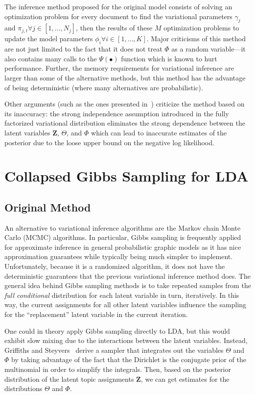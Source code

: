 \documentclass[11pt]{article}
\begin{document}
The inference method proposed for the original model consists of solving an
optimization problem for every document to find the variational parameters
$\gamma_j$ and $\pi_{j,t} \forall j\in[1,\ldots,N_j]$, then the results of
these $M$ optimization problems to update the model parameters
$\phi_i\forall i\in[1,\ldots,K]$. Major criticisms of this method are not
just limited to the fact that it does not treat $\Phi$ as a random
variable---it also contains many calls to the $\Psi(\bullet)$ function
which is known to hurt performance. Further, the memory requirements for
variational inference are larger than some of the alternative methods, but
this method has the advantage of being deterministic (where many
alternatives are probabilistic).

Other arguments (such as the ones presented in~\cite{Teh:2007:CVB})
criticize the method based on its inaccuracy: the strong independence
assumption introduced in the fully factorized variational distribution
eliminates the strong dependence between the latent variables $\mathbf{Z}$,
$\Theta$, and $\Phi$ which can lead to inaccurate estimates of the
posterior due to the loose upper bound on the negative log likelihood.

\section{Collapsed Gibbs Sampling for LDA}
\label{sec:cgs}
\subsection{Original Method}

An alternative to variational inference algorithms are the Markov chain
Monte Carlo (MCMC) algorithms. In particular, Gibbs sampling is frequently
applied for approximate inference in general probabilistic graphic models
as it has nice approximation guarantees while typically being much simpler
to implement. Unfortunately, because it is a randomized algorithm, it does
not have the deterministic guarantees that the previous variational
inference method does. The general idea behind Gibbs sampling methods is to take
repeated samples from the \emph{full conditional} distribution for each
latent variable in turn, iteratively. In this way, the current assignments
for all other latent variables influence the sampling for the
``replacement'' latent variable in the current iteration.

One could in theory apply Gibbs sampling directly to LDA, but this would
exhibit slow mixing due to the interactions between the latent variables.
Instead, Griffiths and Steyvers~\cite{Griffiths:2004:Topics} derive a
sampler that integrates out the variables $\Theta$ and $\Phi$ by taking
advantage of the fact that the Dirichlet is the conjugate prior of the
multinomial in order to simplify the integrals. Then, based on the
posterior distribution of the latent topic assignments $\mathbf{Z}$, we can
get estimates for the distributions $\Theta$ and $\Phi$.
\end{document}
